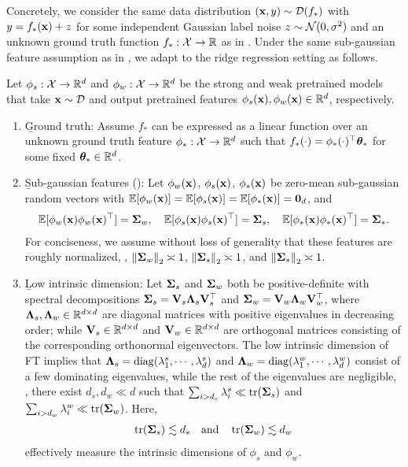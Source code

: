 Concretely, we consider the same data distribution $(\mathbf{x}, y) \sim \mathcal{D}(f_*)$ with $y = f_*(\mathbf{x}) + z$ for some independent Gaussian label noise $z \sim \mathcal{N}(0, \sigma^2)$ and an unknown ground truth function $f_*: \mathcal{X} \to \mathbb{R}$ as in .
Under the same sub-gaussian feature assumption as in , we adapt  to the ridge regression setting as follows.
\begin{assumption}\label{asm:ridge_regression}
    Let $\phi_s: \mathcal{X} \to \mathbb{R}^d$ and $\phi_w: \mathcal{X} \to \mathbb{R}^d$ be the strong and weak pretrained models that take $\mathbf{x} \sim \mathcal{D}$ and output pretrained features $\phi_s(\mathbf{x}), \phi_w(\mathbf{x}) \in \mathbb{R}^d$, respectively.
    \begin{enumerate}[label=(\roman*)]
        \item \b{Ground truth}: Assume $f_*$ can be expressed as a linear function over an unknown ground truth feature $\phi_*: \mathcal{X} \to \mathbb{R}^d$ such that $f_*(\cdot) = \phi_*(\cdot)^\top \boldsymbol{\theta}_*$ for some fixed $\boldsymbol{\theta}_* \in \mathbb{R}^d$.
        \item \b{Sub-gaussian features} (): Let $\phi_w(\mathbf{x})$, $\phi_s(\mathbf{x})$, $\phi_*(\mathbf{x})$ be zero-mean sub-gaussian random vectors with $\mathbb{E}[\phi_w(\mathbf{x})] = \mathbb{E}[\phi_s(\mathbf{x})] = \mathbb{E}[\phi_*(\mathbf{x})] = \textbf{0}_d$, and 
        \begin{align*}
            \mathbb{E}[\phi_w(\mathbf{x}) \phi_w(\mathbf{x})^\top] = \boldsymbol{\Sigma}_w, \quad \mathbb{E}[\phi_s(\mathbf{x}) \phi_s(\mathbf{x})^\top] = \boldsymbol{\Sigma}_s, \quad \mathbb{E}[\phi_*(\mathbf{x}) \phi_*(\mathbf{x})^\top] = \boldsymbol{\Sigma}_*.
        \end{align*}
        For conciseness, we assume without loss of generality that these features are roughly normalized, \ie, $\left\|\boldsymbol{\Sigma}_w\right\|_2 \asymp 1$, $\left\|\boldsymbol{\Sigma}_s\right\|_2 \asymp 1$, and $\left\|\boldsymbol{\Sigma}_*\right\|_2 \asymp 1$.
        \item \b{Low intrinsic dimension}: Let $\boldsymbol{\Sigma}_s$ and $\boldsymbol{\Sigma}_w$ both be \b{positive-definite} with spectral decompositions $\boldsymbol{\Sigma}_s = \mathbf{V}_s \boldsymbol{\Lambda}_s \mathbf{V}_s^\top$ and $\boldsymbol{\Sigma}_w = \mathbf{V}_w \boldsymbol{\Lambda}_w \mathbf{V}_w^\top$, where $\boldsymbol{\Lambda}_s, \boldsymbol{\Lambda}_w \in \mathbb{R}^{d \times d}$ are diagonal matrices with positive eigenvalues in decreasing order; while $\mathbf{V}_s \in \mathbb{R}^{d \times d}$ and $\mathbf{V}_w \in \mathbb{R}^{d \times d}$ are orthogonal matrices consisting of the corresponding orthonormal eigenvectors. The low intrinsic dimension of FT implies that $\boldsymbol{\Lambda}_s = \mathop{\mathrm{diag}}(\lambda^s_1,\cdots,\lambda^s_d)$ and $\boldsymbol{\Lambda}_w = \mathop{\mathrm{diag}}(\lambda^w_1,\cdots,\lambda^w_d)$ consist of a few dominating eigenvalues, while the rest of the eigenvalues are negligible, \ie, there exist $d_s, d_w \ll d$ such that $\sum_{i > d_s} \lambda^s_i \ll \mathop{\mathrm{tr}}(\boldsymbol{\Sigma}_s)$ and $\sum_{i > d_w} \lambda^w_i \ll \mathop{\mathrm{tr}}(\boldsymbol{\Sigma}_w)$. Here, 
        \begin{align*}
            \mathop{\mathrm{tr}}(\boldsymbol{\Sigma}_s) \lesssim d_s \quad \text{and} \quad \mathop{\mathrm{tr}}(\boldsymbol{\Sigma}_w) \lesssim d_w
        \end{align*}
        effectively measure the intrinsic dimensions of $\phi_s$ and $\phi_w$.
    \end{enumerate}
\end{assumption}

